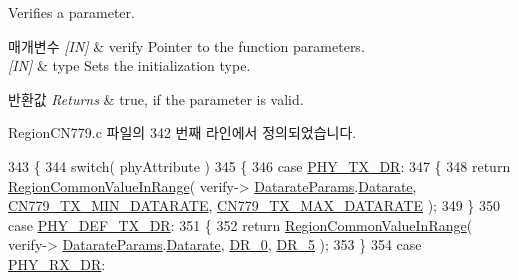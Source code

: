 Verifies a parameter. 


\begin{DoxyParams}{매개변수}
{\em \mbox{[}\+I\+N\mbox{]}} & verify Pointer to the function parameters.\\
\hline
{\em \mbox{[}\+I\+N\mbox{]}} & type Sets the initialization type.\\
\hline
\end{DoxyParams}

\begin{DoxyRetVals}{반환값}
{\em Returns} & true, if the parameter is valid. \\
\hline
\end{DoxyRetVals}


Region\+C\+N779.\+c 파일의 342 번째 라인에서 정의되었습니다.


\begin{DoxyCode}
343 \{
344     \textcolor{keywordflow}{switch}( phyAttribute )
345     \{
346         \textcolor{keywordflow}{case} \mbox{\hyperlink{group___r_e_g_i_o_n_gga51cbe8f5433d914fe9cf81b451de2c2da62c19af9dc2c54540562e1158c015f57}{PHY\_TX\_DR}}:
347         \{
348             \textcolor{keywordflow}{return} \mbox{\hyperlink{group___r_e_g_i_o_n_c_o_m_m_o_n_gafdd1c80d953e18d755a631b72a9c3bd3}{RegionCommonValueInRange}}( verify->
      \mbox{\hyperlink{unionu_verify_params_a92427be16343eb3d9c14334eb95ec058}{DatarateParams}}.\mbox{\hyperlink{structu_verify_params_1_1s_datarate_params_ae2f6080f3aa0e9485c55513ca56bb24d}{Datarate}}, \mbox{\hyperlink{group___r_e_g_i_o_n_c_n779_ga78e9e4ce4dd6df844573865d9de7e268}{CN779\_TX\_MIN\_DATARATE}}, 
      \mbox{\hyperlink{group___r_e_g_i_o_n_c_n779_gabc1992b9207de536e7b92f2d51e6b7e4}{CN779\_TX\_MAX\_DATARATE}} );
349         \}
350         \textcolor{keywordflow}{case} \mbox{\hyperlink{group___r_e_g_i_o_n_gga51cbe8f5433d914fe9cf81b451de2c2da70c3923333165960549162e3dcf10467}{PHY\_DEF\_TX\_DR}}:
351         \{
352             \textcolor{keywordflow}{return} \mbox{\hyperlink{group___r_e_g_i_o_n_c_o_m_m_o_n_gafdd1c80d953e18d755a631b72a9c3bd3}{RegionCommonValueInRange}}( verify->
      \mbox{\hyperlink{unionu_verify_params_a92427be16343eb3d9c14334eb95ec058}{DatarateParams}}.\mbox{\hyperlink{structu_verify_params_1_1s_datarate_params_ae2f6080f3aa0e9485c55513ca56bb24d}{Datarate}}, \mbox{\hyperlink{group___r_e_g_i_o_n_ga6c4ef966b4f3d5eb7597b087f2b97095}{DR\_0}}, \mbox{\hyperlink{group___r_e_g_i_o_n_ga872e12c82020c02a7f70a1c6ed1375df}{DR\_5}} );
353         \}
354         \textcolor{keywordflow}{case} \mbox{\hyperlink{group___r_e_g_i_o_n_gga51cbe8f5433d914fe9cf81b451de2c2da8cc3b895173b07ee71127e366c8d0d55}{PHY\_RX\_DR}}:

\end{DoxyCode}
